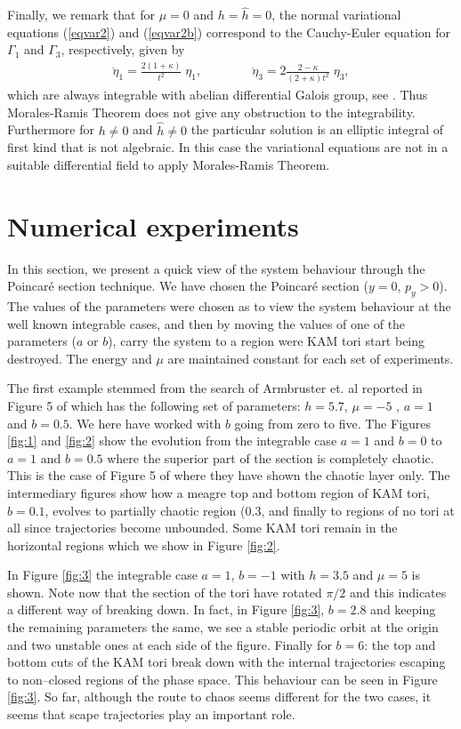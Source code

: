 \documentclass[final]{siamart0516}
\begin{document}
Finally, we remark that  for $\mu=0$ and $h=\hat{h}=0$, the normal variational equations (\ref{eqvar2}) and  (\ref{eqvar2b}) correspond to the Cauchy-Euler equation for $\Gamma_1$ and $\Gamma_3$, respectively,  given by
\begin{eqnarray*}
\ddot\eta_1=\frac{2(1+\kappa)}{t^2}\; \eta_1, \qquad\qquad
\ddot\eta_3=2\frac{2-\kappa}{(2+\kappa)t^2}\; \eta_3,
\end{eqnarray*}
which are always integrable with abelian differential Galois group, 
see \cite{acbook,acmowe}.
Thus Morales-Ramis Theorem does not  give any obstruction to  the integrability.
Furthermore for $h\neq 0$ and $\hat{h}\neq 0$ the particular solution is an elliptic integral of
first kind that is  not algebraic. In this case
the variational equations are not in a suitable differential field to
apply Morales-Ramis Theorem. 

\section{Numerical experiments}\label{sec-poincare}
In this section, we present a quick view of the system behaviour through 
the  Poincar\'e section technique.  We have chosen the Poincar\'e section  ($y=0$, $p_y > 0$). The values of the parameters 
were chosen as to view the system behaviour at the well known integrable cases, and then by moving   the values of one
of the parameters ($a$ or $b$),
carry the system to a region were KAM tori start being destroyed. The energy and $\mu$ are maintained constant for each set
of experiments.

The first example stemmed from the search of Armbruster et. al  reported in Figure 5 of  \cite{agk} which has the following set of parameters: $h=5.7$,  $\mu= - 5$ , $a = 1$ and $ b = 0.5$. We here have worked with $b$ going from zero to five. The Figures \ref{fig:1} and \ref{fig:2} show the evolution from the integrable case $a=1$ and $b=0$ to $a=1$ and $b=0.5$ where the superior part of the section is completely chaotic. This is the case of Figure 5  of  \cite{agk} where they have shown the chaotic layer only. The intermediary figures show how a meagre top and bottom region of KAM
tori, $b=0.1$,  evolves to partially chaotic region ($0. 3$, and finally to regions of  no tori at all since trajectories  become unbounded. Some KAM tori remain in the horizontal regions  which we show in Figure \ref{fig:2}.

In Figure \ref{fig:3}  the integrable case $a=1$, $b=-1$ with $h=3.5$ and $\mu=5$  is shown. Note now that the section of the tori
have rotated $\pi/2$ and this indicates a different way of breaking down. In fact, in Figure \ref{fig:3},  $b=2.8$ and keeping the remaining parameters the same, we see a stable periodic orbit at the origin and two unstable ones at each side of the figure.  Finally for $b=6$: the  top and
bottom cuts of the KAM tori break down with the internal trajectories escaping to non--closed regions of the phase space.  This behaviour can be seen in Figure \ref{fig:3}. So far, although the route to chaos seems different for the two cases, it seems that scape trajectories play an important role.
\end{document}
